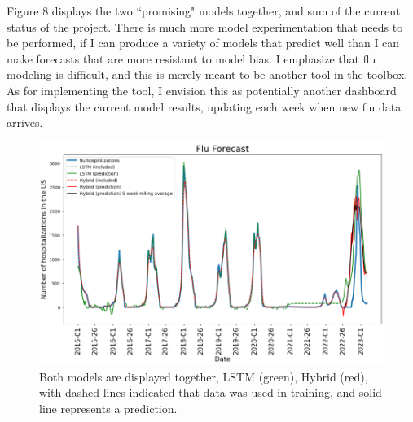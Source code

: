 \documentclass[12pt,a4paper,english]{article}
\begin{document}
Figure 8 displays the two ``promising" models together, and sum of the current status of the project. There is much more model experimentation that needs to be performed, if I can produce a variety of models that predict well than I can make forecasts that are more resistant to model bias. I emphasize that flu modeling is difficult, and this is merely meant to be another tool in the toolbox. As for implementing the tool, I envision this as potentially another dashboard that displays the current model results, updating each week when new flu data arrives.


	\begin{figure}[h!]
		\centering
		\includegraphics[scale=0.75]{Pictures/flu_models.png}
		\caption{Both models are displayed together, LSTM (green), Hybrid (red), with dashed lines indicated that data was used in training, and solid line represents a prediction.}
		\label{fig:flu_models}
	\end{figure}
\end{document}
